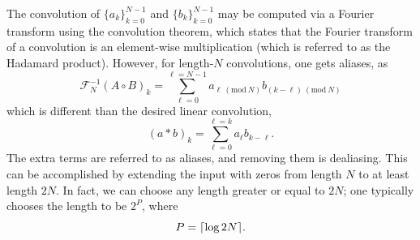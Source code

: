 \documentclass[12pt]{article}
\DeclarePairedDelimiter\ceil{\lceil}{\rceil}
\newcommand{\Mod}[1]{\ (\mathrm{mod}\ #1)}
\renewcommand{\(}{\left(}
\renewcommand{\)}{\right)}
\begin{document}
The convolution of $\{a_k\}_{k=0}^{N-1}$ and $\{b_k\}_{k=0}^{N-1}$ may
be computed via a Fourier transform using the convolution theorem,
which states that the Fourier transform of a convolution is an
element-wise multiplication (which is referred to as the Hadamard
product).  However, for length-$N$ convolutions, one gets aliases, as
\begin{dmath}
  \mathcal{F}^{-1}_N(A\circ{}B)_k
  = \sum_{\ell=0}^{\ell=N-1}a_{\ell \Mod N} b_{(k-\ell) \Mod N}
\end{dmath}
which is different than the desired linear convolution, 
\begin{dmath}
  (a*b)_k
  = \sum_{\ell=0}^{\ell=k}a_{\ell} b_{k-\ell}.
\end{dmath}
The extra terms are referred to as aliases, and removing them is
dealiasing.  This can be accomplished by extending the input with
zeros from length $N$ to at least length $2N$.  In fact, we can choose
any length greater or equal to $2N$; one typically chooses the length
to be $2^P$, where
\begin{dmath}
  P = \ceil{\log{2N}}.
\end{dmath}
\end{document}

